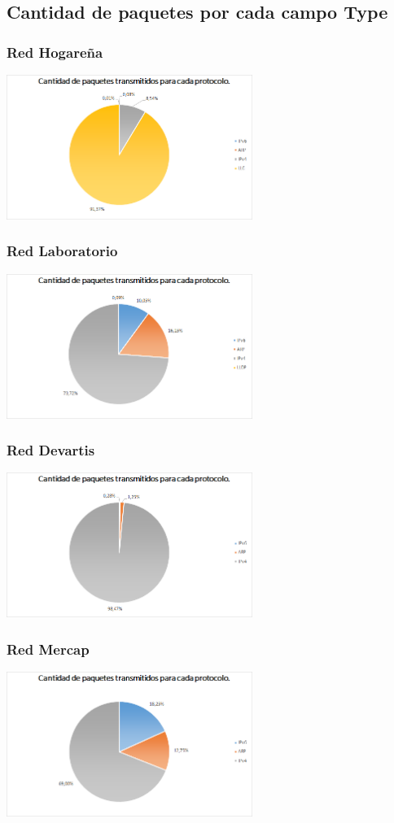 \subsection{Cantidad de paquetes por cada campo Type}

\subsubsection{Red Hogareña}

\centerline{\includegraphics[width=0.6\textwidth]{./graficos/paquetesVSProtocolo/casa_mari2.png}}

\subsubsection{Red Laboratorio}

\centerline{\includegraphics[width=0.6\textwidth]{./graficos/paquetesVSProtocolo/labo52.png}}

\subsubsection{Red Devartis}

\centerline{\includegraphics[width=0.6\textwidth]{./graficos/paquetesVSProtocolo/laburo_mari2.png}}

\subsubsection{Red Mercap}

\centerline{\includegraphics[width=0.6\textwidth]{./graficos/paquetesVSProtocolo/laburo_eze2.png}}